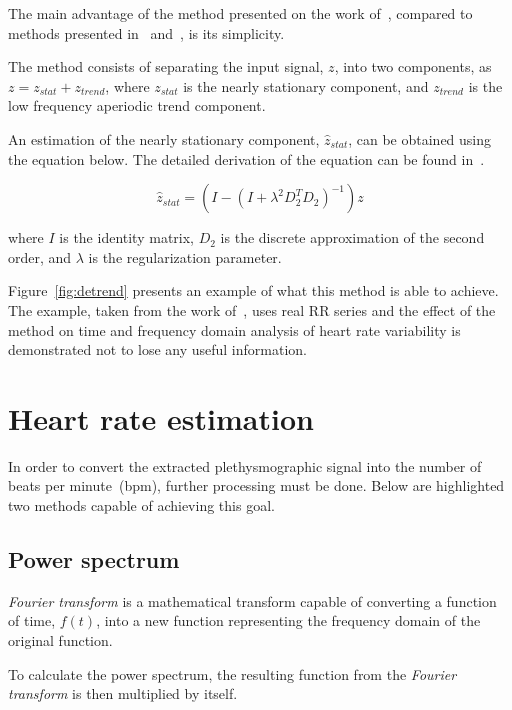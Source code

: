 The main advantage of the method presented on the work
of~\cite{Tarvainen2002Advanced}, compared to methods presented
in~\cite{Litvack1995Time} and~\cite{Porges1990Analysis}, is its simplicity.

The method consists of separating the input signal, $z$, into two components,
as $z = z_{stat} + z_{trend}$, where $z_{stat}$ is the nearly stationary
component, and $z_{trend}$ is the low frequency aperiodic trend component.

An estimation of the nearly stationary component, $\hat{z}_{stat}$, can
be obtained using the equation below. The detailed derivation of the equation
can be found in~\cite{Tarvainen2002Advanced}.

\begin{equation}
  \hat{z}_{stat} = (I - (I + \lambda^2 D_2^T D_2)^{-1}) z
\end{equation}

where $I$ is the identity matrix, $D_2$ is the discrete approximation of the
second order, and $\lambda$ is the regularization parameter.


Figure~\ref{fig:detrend} presents an example of what this method is able to
achieve. The example, taken from the work of~\cite{Tarvainen2002Advanced}, uses
real RR series and the effect of the method on time and frequency domain
analysis of heart rate variability is demonstrated not to lose any useful
information.

\section{Heart rate estimation} \label{sec:sota:estimation}

In order to convert the extracted plethysmographic signal into the number
of beats per minute~(bpm), further processing must be done. Below are
highlighted two methods capable of achieving this goal.

\subsection{Power spectrum} \label{sec:sota:estimation:power}

\emph{Fourier transform} is a mathematical transform capable of converting
a function of time, $f(t)$, into a new function representing the frequency
domain of the original function.

To calculate the power spectrum, the resulting function from the
\emph{Fourier transform} is then multiplied by itself.

